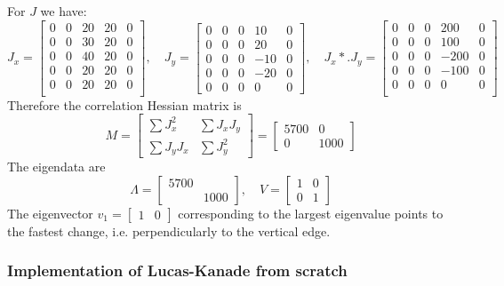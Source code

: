 \documentclass[a4paper]{article}
\begin{document}
For $J$ we have:
\[
J_x = 
\begin{bmatrix}
0 & 0 & 20 & 20 & 0 \\
0 & 0 & 30 & 20 & 0 \\
0 & 0 & 40 & 20 & 0 \\
0 & 0 & 20 & 20 & 0 \\
0 & 0 & 20 & 20 & 0 \\
\end{bmatrix},  \quad
J_y = 
\begin{bmatrix}
0 & 0 & 0 & 10 & 0 \\
0 & 0 & 0 & 20 & 0 \\
0 & 0 & 0 & -10 & 0 \\
0 & 0 & 0 & -20 & 0\\
0 & 0 & 0 & 0 & 0 
\end{bmatrix}, \quad
J_x *. J_y = 
\begin{bmatrix}
0 & 0 & 0 & 200 & 0 \\
0 & 0 & 0 & 100 & 0 \\
0 & 0 & 0 & -200 & 0 \\
0 & 0 & 0 & -100 & 0 \\
0 & 0 & 0 & 0 & 0 \\
\end{bmatrix}
\]
Therefore the correlation Hessian matrix is
\[
M = \begin{bmatrix}
\sum J_x^2 & \sum J_xJ_y \\
\sum J_yJ_x & \sum J_y^2
\end{bmatrix} =
\begin{bmatrix}
5700 & 0 \\
0 & 1000
\end{bmatrix}
\]
The eigendata are
\[
\Lambda = \begin{bmatrix}
5700 & \\
 & 1000
\end{bmatrix},\quad
V = 
\begin{bmatrix}
1 & 0 \\ 0 & 1
\end{bmatrix}
\]
The eigenvector $v_1 = \begin{bmatrix}1 & 0\end{bmatrix}$ corresponding to the largest eigenvalue points to the fastest change, i.e. perpendicularly to the vertical edge.


\subsubsection{Implementation of Lucas-Kanade from scratch}
\end{document}

